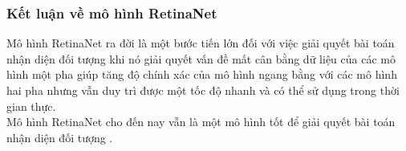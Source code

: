 {    %

    \subsubsection*{Kết luận về mô hình RetinaNet}
    Mô hình RetinaNet  ra đời là một bước tiến lớn đối với việc giải quyết bài toán nhận diện đối tượng  khi nó giải quyết vấn đề mất cân bằng dữ liệu  của các mô hình một pha  giúp tăng độ chính xác của mô hình ngang bằng với các mô hình hai pha  nhưng vẫn duy trì được một tốc độ nhanh và có thể sử dụng trong thời gian thực. \\
    Mô hình RetinaNet  cho đến nay vẫn là một mô hình tốt để giải quyết bài toán nhận diện đối tượng .
}